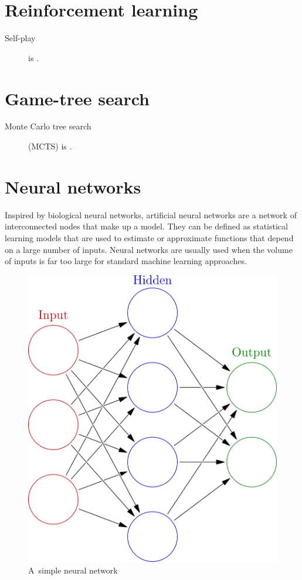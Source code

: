 \documentclass[a4paper,10pt]{article}
\begin{document}
\section{Reinforcement learning}
\begin{description}
  \item [Self-play] is \todo.
\end{description}

\section{Game-tree search}
\begin{description}
  \item [Monte Carlo tree search] (MCTS) is \todo.
\end{description}

\section{Neural networks}
Inspired by biological neural networks, artificial neural networks are a network of interconnected nodes that make up a model.
They can be defined as statistical learning models that are used to estimate or approximate functions that depend on a large number of inputs.
Neural networks are usually used when the volume of inputs is far too large for standard machine learning approaches.

\begin{figure}[H]
  \centering
  \includegraphics[height=.2\textheight]{../img/colored_neural_network.png}
  \caption{A~simple neural network}
  \label{fig:neural_network}
\end{figure}
\end{document}
